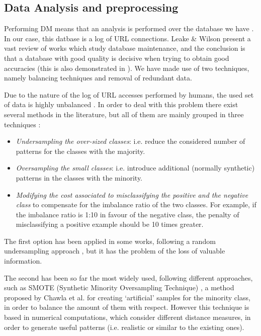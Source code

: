 \documentclass{llncs}
\begin{document}
%
\subsection{Data Analysis and preprocessing}
\label{subsec:dataanalysis}

Performing DM means that an analysis is performed over the database we have \cite{Frank2011}. In our case, this datbase is a log of URL connections. Leake \& Wilson \cite{wilson2001maintaining} present a vast review of works which study database maintenance, and the conclusion is that a database with good quality is decisive when trying to obtain good accuracies (this is also demonstrated in \cite{zeineb2014thesis}). We have made use of two techniques, namely balancing techniques and removal of redundant data.

Due to the nature of the log of URL accesses performed by humans, the used set of data is highly unbalanced \cite{imbalanced_data_05}. In order to deal with this problem there exist several methods in the
literature, but all of them are mainly grouped in three techniques
\cite{imbalance_techniques_02}: 

\begin{itemize}
\item \textit{Undersampling the over-sized classes}: i.e. reduce the considered number of patterns for the classes with the majority.
\item \textit{Oversampling the small classes}: i.e. introduce additional (normally synthetic) patterns in the classes with the minority.
\item \textit{Modifying the cost associated to misclassifying the positive and the negative class} to compensate for the imbalance ratio of the two classes. For example, if the imbalance ratio is 1:10 in favour of the negative class, the penalty of misclassifying a positive example should be 10 times greater.
\end{itemize}

The first option has been applied in some works, following a random undersampling approach \cite{random_undersampling_08}, but it has the problem of the loss of valuable information. 

The second has been so far the most widely used, following different approaches, such as SMOTE (Synthetic Minority Oversampling Technique) \cite{smote_02}, a method proposed by Chawla et al. for creating `artificial' samples for the minority class, in order to balance the amount of them with respect. However this technique is based in numerical computations, which consider different distance measures, in order to generate useful patterns  (i.e. realistic or similar to the existing ones).
\end{document}
